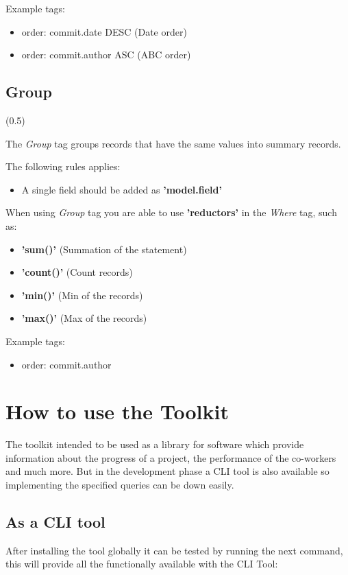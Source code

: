 Example tags:
\begin{itemize}
	\item order: commit.date DESC (Date order)
	\item order: commit.author ASC (ABC order)
\end{itemize}

\subsection{Group} (0.5)

The \textit{Group} tag groups records that have the same values into summary records.

The following rules applies:
\begin{itemize}
	\item A single field should be added as \textbf{'{model}.{field}'}
\end{itemize}

When using \textit{Group} tag you are able to use \textbf{'reductors'} in the \textit{Where} tag, such as:
\begin{itemize}
	\item \textbf{'sum()'} (Summation of the statement)
	\item \textbf{'count()'} (Count records)
	\item \textbf{'min()'} (Min of the records)
	\item \textbf{'max()'} (Max of the records)
\end{itemize}

Example tags:
\begin{itemize}
	\item order: commit.author
\end{itemize}

\section{How to use the Toolkit}
The toolkit intended to be used as a library for software which provide information about the progress of a project, the performance of the co-workers and much more. But in the development phase a CLI tool is also available so implementing the specified queries can be down easily.

\subsection{As a CLI tool}
After installing the tool globally it can be tested by running the next command, this will provide all the functionally available with the CLI Tool:

